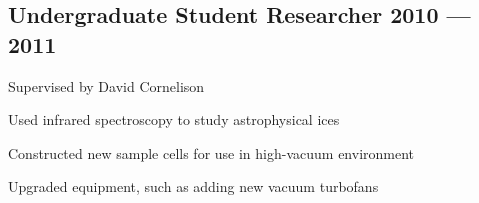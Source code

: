 \documentclass[letter,10pt]{article}
\begin{document}
\subsection{{Undergraduate Student Researcher \hfill 2010 --- 2011}}
\begin{zitemize}
\item Supervised by David Cornelison
\item Used infrared spectroscopy to study astrophysical ices
\item Constructed new sample cells for use in high-vacuum environment
\item Upgraded equipment, such as adding new vacuum turbofans
\end{zitemize}
\end{document}
